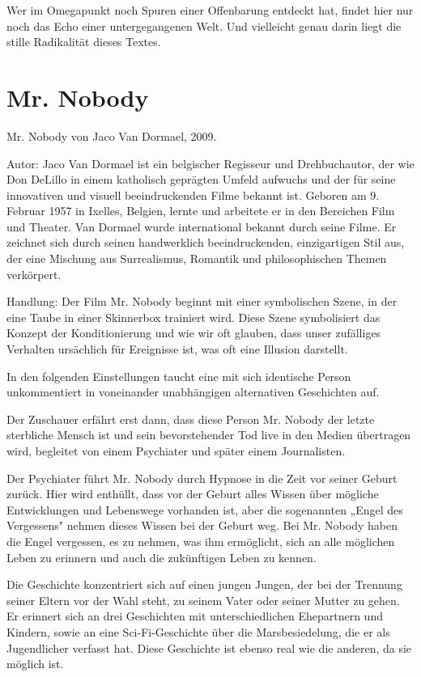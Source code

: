 \documentclass[
  ngerman,
]{article}
\begin{document}
Wer im Omegapunkt noch Spuren einer Offenbarung entdeckt hat, findet
hier nur noch das Echo einer untergegangenen Welt. Und vielleicht genau
darin liegt die stille Radikalität dieses Textes.

\section{Mr. Nobody}\label{mr.-nobody}

Mr. Nobody von Jaco Van Dormael, 2009.

Autor: Jaco Van Dormael ist ein belgischer Regisseur und Drehbuchautor,
der wie Don DeLillo in einem katholisch geprägten Umfeld aufwuchs und
der für seine innovativen und visuell beeindruckenden Filme bekannt ist.
Geboren am 9. Februar 1957 in Ixelles, Belgien, lernte und arbeitete er
in den Bereichen Film und Theater. Van Dormael wurde international
bekannt durch seine Filme. Er zeichnet sich durch seinen handwerklich
beeindruckenden, einzigartigen Stil aus, der eine Mischung aus
Surrealismus, Romantik und philosophischen Themen verkörpert.

Handlung: Der Film Mr. Nobody beginnt mit einer symbolischen Szene, in
der eine Taube in einer Skinnerbox trainiert wird. Diese Szene
symbolisiert das Konzept der Konditionierung und wie wir oft glauben,
dass unser zufälliges Verhalten ursächlich für Ereignisse ist, was oft
eine Illusion darstellt.

In den folgenden Einstellungen taucht eine mit sich identische Person
unkommentiert in voneinander unabhängigen alternativen Geschichten auf.

Der Zuschauer erfährt erst dann, dass diese Person Mr. Nobody der letzte
sterbliche Mensch ist und sein bevorstehender Tod live in den Medien
übertragen wird, begleitet von einem Psychiater und später einem
Journalisten.

Der Psychiater führt Mr. Nobody durch Hypnose in die Zeit vor seiner
Geburt zurück. Hier wird enthüllt, dass vor der Geburt alles Wissen über
mögliche Entwicklungen und Lebenswege vorhanden ist, aber die
sogenannten „Engel des Vergessens" nehmen dieses Wissen bei der Geburt
weg. Bei Mr. Nobody haben die Engel vergessen, es zu nehmen, was ihm
ermöglicht, sich an alle möglichen Leben zu erinnern und auch die
zukünftigen Leben zu kennen.

Die Geschichte konzentriert sich auf einen jungen Jungen, der bei der
Trennung seiner Eltern vor der Wahl steht, zu seinem Vater oder seiner
Mutter zu gehen. Er erinnert sich an drei Geschichten mit
unterschiedlichen Ehepartnern und Kindern, sowie an eine
Sci-Fi-Geschichte über die Marsbesiedelung, die er als Jugendlicher
verfasst hat. Diese Geschichte ist ebenso real wie die anderen, da sie
möglich ist.
\end{document}
